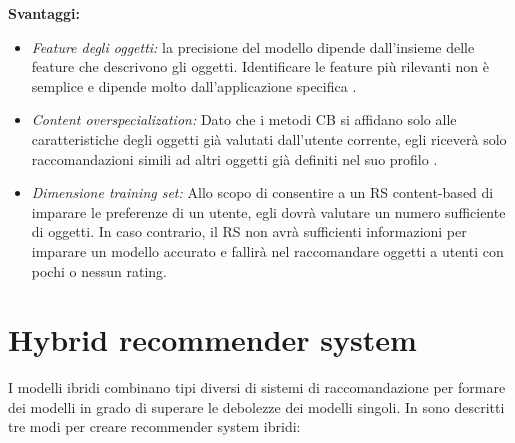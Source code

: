 \noindent \textbf{Svantaggi:}
\begin{itemize}
 \item \textit{Feature degli oggetti:} la precisione del modello dipende dall'insieme delle feature che descrivono gli oggetti. Identificare le feature più rilevanti non è semplice e dipende molto dall'applicazione specifica \cite{survey-mattia}.
 
 \item \textit{Content overspecialization:} Dato che i metodi CB si affidano solo alle caratteristiche degli oggetti già valutati dall'utente corrente, egli riceverà solo raccomandazioni simili ad altri oggetti già definiti nel suo profilo \cite{recsys-principle-methods-evaluation}.
 
 \item \textit{Dimensione training set:} Allo scopo di consentire a un RS content-based di imparare le preferenze di un utente, egli dovrà valutare un numero sufficiente di oggetti. In caso contrario, il RS non avrà sufficienti informazioni per imparare un modello accurato e fallirà nel raccomandare oggetti a utenti con pochi o nessun rating.
\end{itemize}

\section{Hybrid recommender system}
I modelli ibridi combinano tipi diversi di sistemi di raccomandazione per formare dei modelli in grado di superare le debolezze dei modelli singoli. In \cite{recsys-book} sono descritti tre modi per creare recommender system ibridi:

